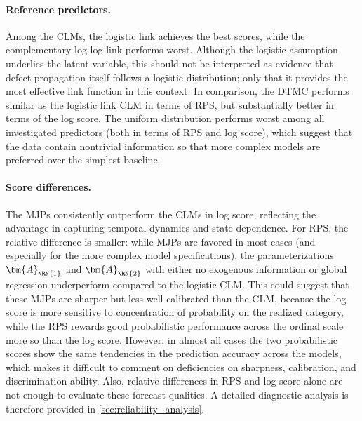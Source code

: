 \paragraph{Reference predictors.}
Among the CLMs, the logistic link achieves the best scores, while the complementary log-log link performs worst. Although the logistic assumption underlies the latent variable, this should not be interpreted as evidence that defect propagation itself follows a logistic distribution; only that it provides the most effective link function in this context. 
In comparison, the DTMC performs similar as the logistic link CLM in terms of RPS, but substantially better in terms of the log score.
The uniform distribution performs worst among all investigated predictors (both in terms of RPS and log score), which suggest that the data contain nontrivial information so that more complex models are preferred over the simplest baseline. 


\paragraph{Score differences.}
The MJPs consistently outperform the CLMs in log score, reflecting the advantage in capturing temporal dynamics and state dependence. For RPS, the relative difference is smaller: while MJPs are favored in most cases (and especially for the more complex model specifications), the parameterizations $\bm{A}_{\RN{1}}$ and $\bm{A}_{\RN{2}}$ with either no exogenous information or global regression underperform compared to the logistic CLM. This could suggest that these MJPs are sharper but less well calibrated than the CLM, because the log score is more sensitive to concentration of probability on the realized category, while the RPS rewards good probabilistic performance across the ordinal scale more so than the log score.
However, in almost all cases the two probabilistic scores show the same tendencies in the prediction accuracy across the models, which makes it difficult to comment on deficiencies on sharpness, calibration, and discrimination ability. Also, relative differences in RPS and log score alone are not enough to evaluate these forecast qualities. A detailed diagnostic analysis is therefore provided in \cref{sec:reliability_analysis}.

